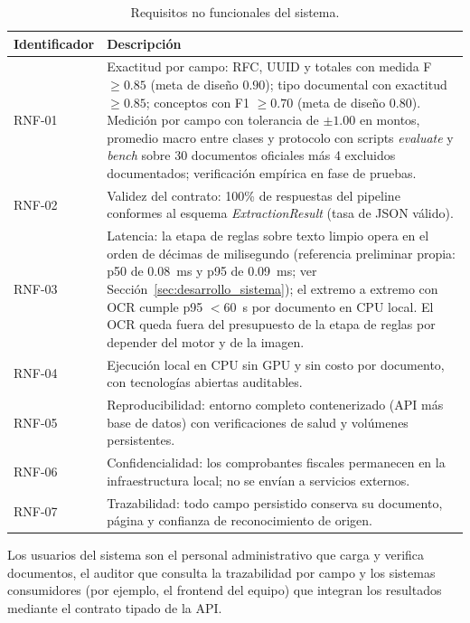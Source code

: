 \begin{table}[H]
\centering
\small
\caption{Requisitos no funcionales del sistema.}
\label{tab:requisitos_no_funcionales}
\begin{tabular}{@{}p{2.8cm}p{10.7cm}@{}}
\toprule
\textbf{Identificador} & \textbf{Descripción} \\
\midrule
RNF-01 & Exactitud por campo: RFC, UUID y totales con medida F $\geq 0.85$ (meta de dise\~no $0.90$); tipo documental con exactitud $\geq 0.85$; conceptos con F1 $\geq 0.70$ (meta de dise\~no $0.80$). Medici\'on por campo con tolerancia de $\pm 1.00$ en montos, promedio macro entre clases y protocolo con scripts \textit{evaluate} y \textit{bench} sobre 30 documentos oficiales m\'as 4 excluidos documentados; verificaci\'on emp\'irica en fase de pruebas\cite{sokolova_metrics_2009, structured_extraction_2023}. \\
RNF-02 & Validez del contrato: 100\% de respuestas del pipeline conformes al esquema \textit{ExtractionResult} (tasa de JSON válido)\cite{pydantic_v2_2024}. \\
RNF-03 & Latencia: la etapa de reglas sobre texto limpio opera en el orden de d\'ecimas de milisegundo (referencia preliminar propia: p50 de 0.08~ms y p95 de 0.09~ms; ver Secci\'on~\ref{sec:desarrollo_sistema}); el extremo a extremo con OCR cumple p95 $< 60$~s por documento en CPU local. El OCR queda fuera del presupuesto de la etapa de reglas por depender del motor y de la imagen\cite{sokolova_metrics_2009, tesseract_ocr}. \\
RNF-04 & Ejecución local en CPU sin GPU y sin costo por documento, con tecnologías abiertas auditables\cite{tesseract_ocr, docker_docs}. \\
RNF-05 & Reproducibilidad: entorno completo contenerizado (API más base de datos) con verificaciones de salud y volúmenes persistentes\cite{docker_docs}. \\
RNF-06 & Confidencialidad: los comprobantes fiscales permanecen en la infraestructura local; no se envían a servicios externos\cite{sat_cfdi_2024, gcp_document_ai}. \\
RNF-07 & Trazabilidad: todo campo persistido conserva su documento, página y confianza de reconocimiento de origen\cite{postgres_docs_2024}. \\
\bottomrule
\end{tabular}
\end{table}

Los usuarios del sistema son el personal administrativo que carga y verifica documentos, el auditor que consulta la trazabilidad por campo y los sistemas consumidores (por ejemplo, el frontend del equipo) que integran los resultados mediante el contrato tipado de la API\cite{fielding_rest_2000, fastapi_docs}.

